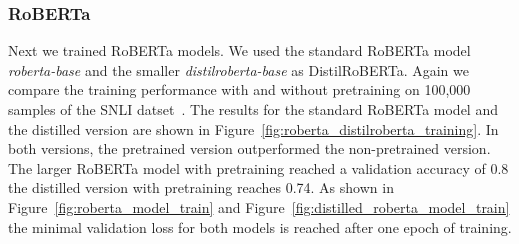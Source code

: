 \documentclass[acmsmall,nonacm]{acmart}
\begin{document}
\newpage
\subsubsection{RoBERTa}
Next we trained RoBERTa models. We used the standard RoBERTa model \textit{roberta-base} and the smaller \textit{distilroberta-base} as DistilRoBERTa. 
Again we compare the training performance with and without pretraining on 100,000 samples of the SNLI datset~\cite{snli-bowman2015}. The results for the standard RoBERTa model and the distilled version are shown in Figure~\ref{fig:roberta_distilroberta_training}. In both versions, the pretrained version outperformed the non-pretrained version. The larger RoBERTa model with pretraining reached a validation accuracy of 0.8 the distilled version with pretraining reaches 0.74. As shown in Figure~\ref{fig:roberta_model_train} and Figure~\ref{fig:distilled_roberta_model_train} the minimal validation loss for both models is reached after one epoch of training.
\end{document}
